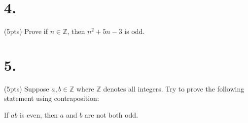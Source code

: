 \documentclass{article}
\newenvironment{Problem}
{\noindent\color{black}}
{\newline}
\newenvironment{Solution}
{\noindent\color{red}}
{\newline}
\begin{document}
\section*{4. }

\begin{Problem}
    (5pts) Prove if $n \in \mathbb Z$, then $n^2+5n-3$ is odd.
\end{Problem}


\section*{5. }

\begin{Problem}
    (5pts) Suppose $a, b \in \mathbb Z$ where $\mathbb Z$ denotes all integers. 
    Try to prove the following statement using contraposition:

    If $ab$ is even, then $a$ and $b$ are not both odd.
\end{Problem}




\end{document}
